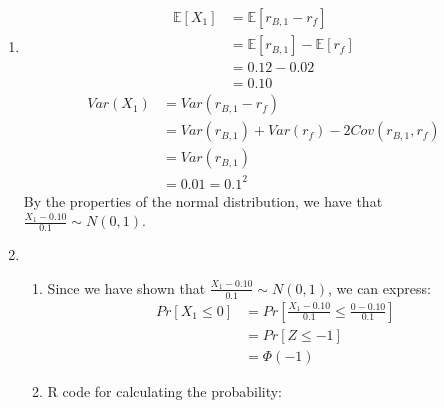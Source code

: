 \documentclass[10pt]{article}
\newcommand{\E}{\mathbb{E}}
\newenvironment{problem}[2][Problem]{\begin{trivlist}
\item[\hskip \labelsep {\bfseries #1}\hskip \labelsep {\bfseries #2.}]}{\end{trivlist}}
\begin{document}
\begin{problem}{5}
    \hfill
    \begin{enumerate}
        \item \hfill
                \begin{align*}
                    \E[X_1] &= \E[r_{B,1} - r_f] \\
                    &= \E[r_{B,1}] - \E[r_f] \\
                    &= 0.12 - 0.02 \\
                    &= 0.10
                \end{align*}
                \begin{align*}
                    Var(X_1) &= Var(r_{B,1} - r_f) \\
                    &= Var(r_{B,1}) + Var(r_f) - 2Cov(r_{B,1}, r_f) \\
                    &= Var(r_{B,1}) \\
                    &= 0.01 = 0.1^2
                \end{align*}
                By the properties of the normal distribution, we have that $\frac{X_1 - 0.10}{0.1} \sim N(0, 1)$.
        \item \hfill
            \begin{enumerate}
                \item Since we have shown that $\frac{X_1 - 0.10}{0.1} \sim N(0, 1)$, we can express:
                    \begin{align*}
                        Pr[X_1 \leq 0] &= Pr[\frac{X_1 - 0.10}{0.1} \leq \frac{0 - 0.10}{0.1}] \\
                        &= Pr[Z \leq -1] \\
                        &= \Phi(-1)
                    \end{align*}
                \item R code for calculating the probability:


\end{enumerate}
\end{enumerate}
\end{problem}
\end{document}

